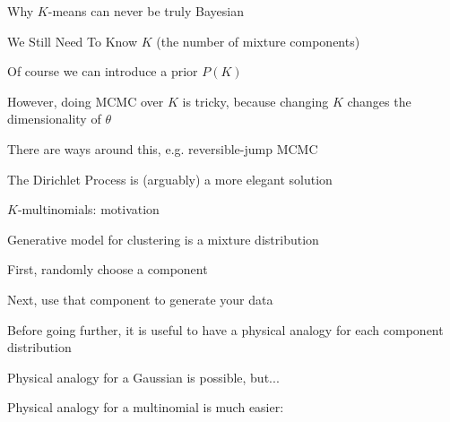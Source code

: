 \documentclass{beamer}
\begin{document}
\begin{frame}{Why $K$-means can never be truly Bayesian}

\itemb
\item \alert{We Still Need To Know $K$} (the number of mixture components)
\item Of course we can introduce a prior $P(K)$
\item However, doing MCMC over $K$ is tricky, because changing $K$ changes the dimensionality of $\theta$
\item There are ways around this, e.g. \alert{reversible-jump MCMC}
\item The Dirichlet Process is (arguably) a more elegant solution
\iteme

\end{frame}

\begin{frame}{$K$-multinomials: motivation}

\itemb
\item Generative model for clustering is a mixture distribution
 \itemb
 \item First, randomly choose a component
 \item Next, use that component to generate your data
 \iteme
\item Before going further, it is useful to have a physical analogy for each component distribution
\itemb
\item Physical analogy for a Gaussian is possible, but...
\item Physical analogy for a multinomial is much easier:
\iteme
\iteme


\end{frame}
\end{document}

